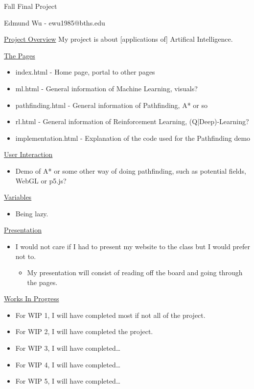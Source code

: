 \documentclass[11pt]{article}
\author{Edmund Wu}
\date{Dec 19, 2017}
\begin{document}
\begin{center}
  Fall Final Project

  Edmund Wu {\hyp} ewu1985@bths.edu
\end{center}

\underline{Project Overview} \newline
My project is about [applications of] Artifical Intelligence.

\underline{The Pages}
\begin{itemize}
  \item index.html {\hyp} Home page, portal to other pages
  \item ml.html {\hyp} General information of Machine Learning, visuals?
  \item pathfinding.html {\hyp} General information of Pathfinding, A* or so
  \item rl.html {\hyp} General information of Reinforcement Learning, (Q|Deep)-Learning?
  \item implementation.html {\hyp} Explanation of the code used for the Pathfinding demo
\end{itemize}

\underline{User Interaction}
\begin{itemize}
  \item Demo of A* or some other way of doing pathfinding, such as potential fields, WebGL or p5.js?
\end{itemize}

\underline{Variables}
\begin{itemize}
  \item Being lazy.
\end{itemize}

\underline{Presentation}
\begin{itemize}
  \item I would not care if I had to present my website to the class but I would prefer not to.
  \begin{itemize}
    \item My presentation will consist of reading off the board and going through the pages.
  \end{itemize}
\end{itemize}

\underline{Works In Progress}
\begin{itemize}
  \item For WIP 1, I will have completed most if not all of the project.
  \item For WIP 2, I will have completed the project.
  \item For WIP 3, I will have completed{\ldots}
  \item For WIP 4, I will have completed{\ldots}
  \item For WIP 5, I will have completed{\ldots}
\end{itemize}
\end{document}
